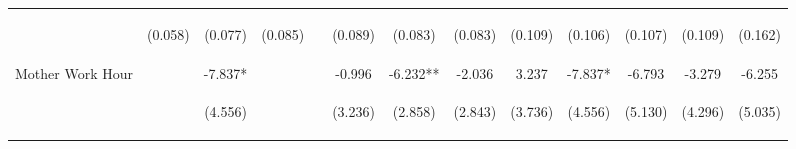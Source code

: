 \begin{tabular}{lcccccccccccc}
 & \begin{footnotesize}(0.058)\end{footnotesize} & \begin{footnotesize}(0.077)\end{footnotesize} & \begin{footnotesize}(0.085)\end{footnotesize} & \begin{footnotesize}\end{footnotesize} & \begin{footnotesize}(0.089)\end{footnotesize} & \begin{footnotesize}(0.083)\end{footnotesize} & \begin{footnotesize}(0.083)\end{footnotesize} & \begin{footnotesize}(0.109)\end{footnotesize} & \begin{footnotesize}(0.106)\end{footnotesize} & \begin{footnotesize}(0.107)\end{footnotesize} & \begin{footnotesize}(0.109)\end{footnotesize} & \begin{footnotesize}(0.162)\end{footnotesize}\\
\noalign{\smallskip}Mother Work Hour &  & -7.837* &  &  & -0.996 & -6.232** & -2.036 & 3.237 & -7.837* & -6.793 & -3.279 & -6.255\\
 & \begin{footnotesize}\end{footnotesize} & \begin{footnotesize}(4.556)\end{footnotesize} & \begin{footnotesize}\end{footnotesize} & \begin{footnotesize}\end{footnotesize} & \begin{footnotesize}(3.236)\end{footnotesize} & \begin{footnotesize}(2.858)\end{footnotesize} & \begin{footnotesize}(2.843)\end{footnotesize} & \begin{footnotesize}(3.736)\end{footnotesize} & \begin{footnotesize}(4.556)\end{footnotesize} & \begin{footnotesize}(5.130)\end{footnotesize} & \begin{footnotesize}(4.296)\end{footnotesize} & \begin{footnotesize}(5.035)\end{footnotesize}\\

\end{tabular}
